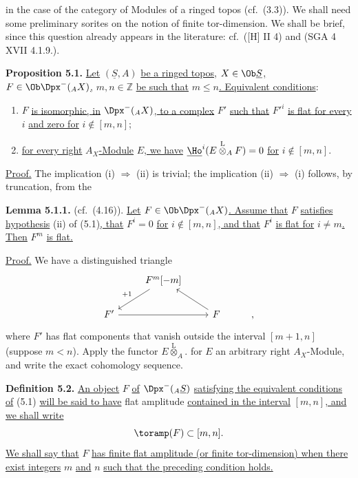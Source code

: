 %
in the case of the category of Modules of a ringed topos (cf.\ (3.3)). We shall need some preliminary sorites on the notion of finite tor-dimension. We shall be brief, since this question already appears in the literature: cf.\ ([H] II 4) and (SGA 4 XVII 4.1.9.).

\textbf{Proposition 5.1.} \uline{Let} \((\underline{S},A)\) \uline{be a ringed topos,} \(X\in\Ob \underline{S}\)\uline{,} \(F\in\Ob\Dpx^-({}_A X)\)\uline{,} \(m,n\in\mathbb Z\) \uline{be such that} \(m\leq n\)\uline{. Equivalent conditions}:
\begin{enumerate}[label=(\roman*)]
\item \(F\) \uline{is isomorphic, in} \(\Dpx^-({}_A X)\)\uline{, to a complex} \(F'\) \uline{such that} \(F'^i\) \uline{is flat for every} \(i\) \uline{and zero for} \(i\notin[m,n]\);
\item \uline{for every right} \(A_X\)\uline{-Module} \(E\)\uline{, we have} \(\underline{\Ho}^i(E\overset{\mathrm L}{\otimes}_A F)=0\) \uline{for} \(i\notin[m,n]\).
\end{enumerate}

\uline{Proof.} The implication (i) \(\Rightarrow\) (ii) is trivial; the implication (ii) \(\Rightarrow\) (i) follows, by truncation, from the

\textbf{Lemma 5.1.1.} (cf.\ (4.16)). \uline{Let} \(F\in\Ob\Dpx^-({}_A X)\)\uline{. Assume that} \(F\) \uline{satisfies hypothesis} (ii) of (5.1)\uline{, that} \(F^i=0\) \uline{for} \(i\notin[m,n]\)\uline{, and that} \(F^i\) \uline{is flat for} \(i\ne m\)\uline{. Then} \(F^m\) \uline{is flat.}

\uline{Proof.} We have a distinguished triangle
\[
\begin{tikzcd}
& F^m[-m] \arrow[dl,"+1"'] & \\
F' \arrow[rr] && F \arrow[ul] & ,
\end{tikzcd}
\]
where \(F'\) has flat components that vanish outside the interval \([m+1,n]\) (suppose \(m<n\)). Apply the functor \(E\overset{\mathrm L}{\otimes}_A.\) for \(E\) an arbitrary right \(A_X\)-Module, and write the exact cohomology sequence.

%
\textbf{Definition 5.2.} \uline{An object} \(F\) \uline{of} \(\Dpx^-({}_A \underline{S})\) \uline{satisfying the equivalent conditions of} (5.1) \uline{will be said to have} flat amplitude \uline{contained in the interval} \([m,n]\)\uline{, and we shall write}
\[
  \toramp(F)\subset[m,n].
\]
\uline{We shall say that} \(F\) \uline{has finite flat amplitude (or finite tor-dimension) when there exist integers} \(m\) \uline{and} \(n\) \uline{such that the preceding condition holds.}

